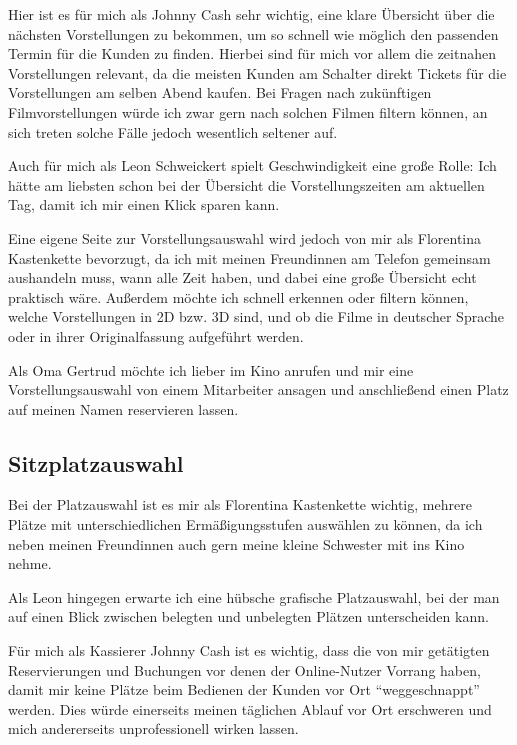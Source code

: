 Hier ist es für mich als Johnny Cash sehr wichtig, eine klare Übersicht über die nächsten Vorstellungen zu bekommen, um so schnell wie möglich den passenden Termin für die Kunden zu finden.
Hierbei sind für mich vor allem die zeitnahen Vorstellungen relevant, da die meisten Kunden am Schalter direkt Tickets für die Vorstellungen am selben Abend kaufen.
Bei Fragen nach zukünftigen Filmvorstellungen würde ich zwar gern nach solchen Filmen filtern können, an sich treten solche Fälle jedoch wesentlich seltener auf.

Auch für mich als Leon Schweickert spielt Geschwindigkeit eine große Rolle: Ich hätte am liebsten schon bei der Übersicht die Vorstellungszeiten am aktuellen Tag, damit ich mir einen Klick sparen kann.

Eine eigene Seite zur Vorstellungsauswahl wird jedoch von mir als Florentina Kastenkette bevorzugt, da ich mit meinen Freundinnen am Telefon gemeinsam aushandeln muss, wann alle Zeit haben, und dabei eine große Übersicht echt praktisch wäre.
Außerdem möchte ich schnell erkennen oder filtern können, welche Vorstellungen in 2D bzw. 3D sind, und ob die Filme in deutscher Sprache oder in ihrer Originalfassung aufgeführt werden.

Als Oma Gertrud möchte ich lieber im Kino anrufen und mir eine Vorstellungsauswahl von einem Mitarbeiter ansagen und anschließend einen Platz auf meinen Namen reservieren lassen.

\subsection{Sitzplatzauswahl}
Bei der Platzauswahl ist es mir als Florentina Kastenkette wichtig, mehrere Plätze mit unterschiedlichen Ermäßigungsstufen auswählen zu können, da ich neben meinen Freundinnen auch gern meine kleine Schwester mit ins Kino nehme.

Als Leon hingegen erwarte ich eine hübsche grafische Platzauswahl, bei der man auf einen Blick zwischen belegten und unbelegten Plätzen unterscheiden kann.

Für mich als Kassierer Johnny Cash ist es wichtig, dass die von mir getätigten Reservierungen und Buchungen vor denen der Online-Nutzer Vorrang haben, damit mir keine Plätze beim Bedienen der Kunden vor Ort \enquote{weggeschnappt} werden.
Dies würde einerseits meinen täglichen Ablauf vor Ort erschweren und mich andererseits unprofessionell wirken lassen.

